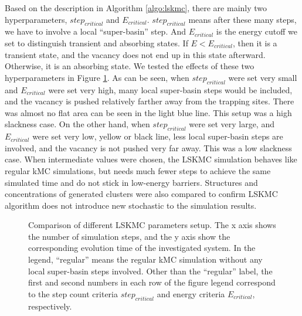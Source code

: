 Based on the description in Algorithm \ref{algo:lskmc}, there are mainly two hyperparameters, $step_{critical}$ and $E_{critical}$. $step_{critical}$ means after these many steps, we have to involve a local ``super-basin'' step. And $E_{critical}$ is the energy cutoff we set to distinguish transient and absorbing states. If $E < E_{critical}$, then it is a transient state, and the vacancy does not end up in this state afterward. Otherwise, it is an absorbing state. We tested the effects of these two hyperparameters in Figure \ref{Chap:Al/Vac:fig:lskmc_time}. As can be seen, when $step_{critical}$ were set very small and $E_{critical}$ were set very high, many local super-basin steps would be included, and the vacancy is pushed relatively farther away from the trapping sites. There was almost no flat area can be seen in the light blue line. This setup was a high slackness case. On the other hand, when $step_{critical}$ were set very large, and $E_{critical}$ were set very low, yellow or black line, less local super-basin steps are involved, and the vacancy is not pushed very far away. This was a low slackness case. When intermediate values were chosen, the \ac{LSKMC} simulation behaves like regular \ac{kMC} simulations, but needs much fewer steps to achieve the same simulated time and do not stick in low-energy barriers.  Structures and concentrations of generated clusters were also compared to confirm \ac{LSKMC} algorithm does not introduce new stochastic to the simulation results.

\begingroup
\begin{figure}[!ht]
  \centering
\caption[Comparison of different \acf{LSKMC} parameters setup.]{Comparison of different \ac{LSKMC} parameters setup. The x axis shows the number of simulation steps, and the y axis show the corresponding evolution time of the investigated system. In the legend, ``regular'' means the regular \ac{kMC} simulation without any local super-basin steps involved. Other than the ``regular'' label, the first and second numbers in each row of the figure legend correspond to the step count criteria $step_{critical}$ and energy criteria $E_{critical}$, respectively.}
\label{Chap:Al/Vac:fig:lskmc_time}
\end{figure}
\endgroup


